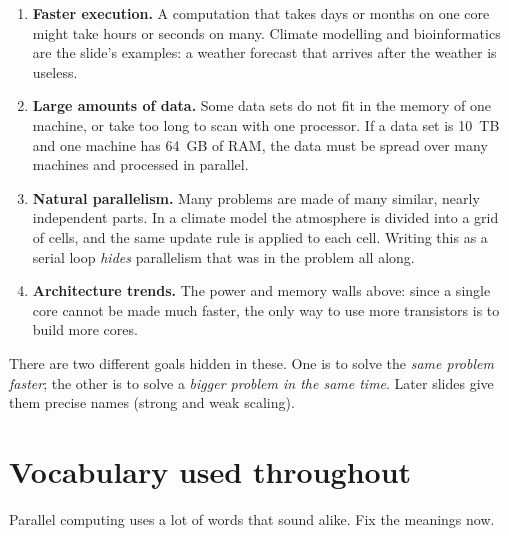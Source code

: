 \begin{enumerate}
  \item \textbf{Faster execution.} A computation that takes days or months on one core might
        take hours or seconds on many. Climate modelling and bioinformatics are the slide's examples:
        a weather forecast that arrives after the weather is useless.
  \item \textbf{Large amounts of data.} Some data sets do not fit in the memory of one machine,
        or take too long to scan with one processor. If a data set is 10~TB and one machine has 64~GB
        of RAM, the data must be spread over many machines and processed in parallel.
  \item \textbf{Natural parallelism.} Many problems are made of many similar, nearly independent parts.
        In a climate model the atmosphere is divided into a grid of cells, and the same update rule is applied to each
        cell. Writing this as a serial loop \emph{hides} parallelism that was in the problem all along.
  \item \textbf{Architecture trends.} The power and memory walls above: since a single core cannot be
        made much faster, the only way to use more transistors is to build more cores.
\end{enumerate}

There are two different goals hidden in these. One is to solve the \emph{same problem faster}; the
other is to solve a \emph{bigger problem in the same time}. Later slides give them precise names
(strong and weak scaling).

\section{Vocabulary used throughout}

Parallel computing uses a lot of words that sound alike. Fix the meanings now.

